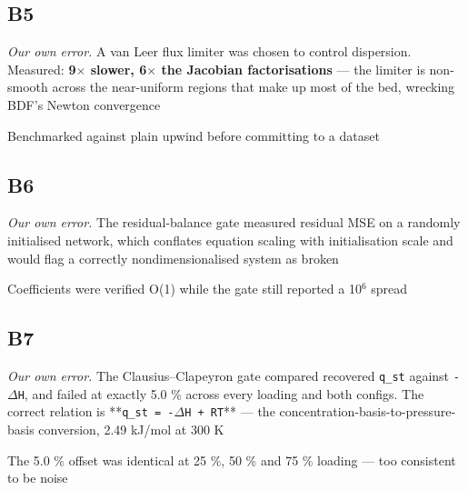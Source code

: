 \documentclass[10pt]{article}
\begin{document}
\subsection*{B5}\label{led:B5}
\begin{description}[leftmargin=0pt,itemsep=1pt]
\item[Defect.] \emph{Our own error.} A van Leer flux limiter was chosen to control dispersion. Measured: \textbf{9$\times$ slower, 6$\times$ the Jacobian factorisations} --- the limiter is non-smooth across the near-uniform regions that make up most of the bed, wrecking BDF's Newton convergence
\item[How it was caught.] Benchmarked against plain upwind before committing to a dataset
\end{description}
\subsection*{B6}\label{led:B6}
\begin{description}[leftmargin=0pt,itemsep=1pt]
\item[Defect.] \emph{Our own error.} The residual-balance gate measured residual MSE on a randomly initialised network, which conflates equation scaling with initialisation scale and would flag a correctly nondimensionalised system as broken
\item[How it was caught.] Coefficients were verified O(1) while the gate still reported a 10$^6$ spread
\end{description}
\subsection*{B7}\label{led:B7}
\begin{description}[leftmargin=0pt,itemsep=1pt]
\item[Defect.] \emph{Our own error.} The Clausius--Clapeyron gate compared recovered \texttt{q\_st} against \texttt{-$\Delta$H}, and failed at exactly 5.0 \% across every loading and both configs. The correct relation is **\texttt{q\_st = -$\Delta$H + RT}** --- the concentration-basis-to-pressure-basis conversion, 2.49 kJ/mol at 300 K
\item[How it was caught.] The 5.0 \% offset was identical at 25 \%, 50 \% and 75 \% loading --- too consistent to be noise
\end{description}
\end{document}
